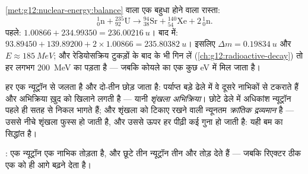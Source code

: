 \begin{example}[एक विखंडन, तौला हुआ]\label{ex:g12:nuclear-energy:fissionbalance}
\cref{met:g12:nuclear-energy:balance} वाला एक बहुधा होने वाला रास्ता:
\[
{}^{1}_{0}\mathrm{n} + {}^{235}_{92}\mathrm{U} \longrightarrow
{}^{94}_{38}\mathrm{Sr} + {}^{140}_{54}\mathrm{Xe} + 2\,{}^{1}_{0}\mathrm{n}.
\]
पहले: $1.00866 + 234.99350 = \qty{236.00216}{u}$। बाद में: $93.89450 + 139.89200 + 2 \times 1.00866 = \qty{235.80382}{u}$। इसलिए $\Delta m = \qty{0.19834}{u}$ और $E \approx \qty{185}{MeV}$; और रेडियोसक्रिय
टुकड़ों के बाद के  भी गिन लें (\cref{ch:g12:radioactive-decay}) तो हर  लगभग \qty{200}{MeV}
का पड़ता है --- जबकि कोयले का एक  कुछ \unit{eV} में मिल जाता है।
\end{example}

\begin{definition}[शृंखला अभिक्रिया और क्रांतिक द्रव्यमान]\label{def:g12:nuclear-energy:chain}
हर  एक न्यूट्रॉन से जलता है और दो-तीन छोड़ जाता है: पर्याप्त बड़े
ढेले में वे दूसरे नाभिकों से टकराते हैं और अभिक्रिया ख़ुद को खिलाने लगती है ---
यानी \emph{शृंखला अभिक्रिया}। छोटे ढेले में अधिकांश
न्यूट्रॉन पहले ही सतह से निकल भागते हैं; और शृंखला को टिकाए रखने वाली न्यूनतम
 \emph{क्रांतिक द्रव्यमान} है --- उससे नीचे
शृंखला फुस्स हो जाती है, और उससे ऊपर हर पीढ़ी कई गुना हो जाती है: यही बम का
सिद्धांत है।
\end{definition}

\begin{omfigure}

{\small {}: एक न्यूट्रॉन एक नाभिक तोड़ता है,
और छूटे तीन न्यूट्रॉन तीन और तोड़ देते हैं --- जबकि रिएक्टर ठीक एक को ही आगे
बढ़ने देता है।}
\end{omfigure}

